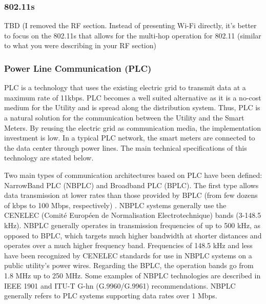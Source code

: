 \documentclass[11pt,draftclsnofoot,onecolumn]{IEEEtran}
\begin{document}
\subsubsection{802.11s}\label{tech::80211s}
TBD
(I removed the RF section. Instead of presenting Wi-Fi directly, it's better to focus on the 802.11s that allows for the multi-hop operation for 802.11 (similar to what you were describing in your RF section)

\subsubsection{Power Line Communication (PLC)}\label{tech::plc}

PLC is a technology that uses the existing electric grid to transmit data at a maximum rate of 11kbps. PLC becomes a well suited alternative as it is a no-cost medium for the Utility and is spread along the distribution system. Thus, PLC is a natural solution for the communication between the Utility and the Smart Meters. By reusing the electric grid as communication media, the implementation investment is low. In a typical PLC network, the smart meters are connected to the data center through power lines. The main technical specifications of this technology are stated below.

Two main types of communication architectures based on PLC have been defined: NarrowBand PLC (NBPLC) and Broadband PLC (BPLC). The first type allows data transmission at lower rates than those provided by BPLC (from few dozens of kbps to 100 Mbps, respectively) \cite{Sabbah2014}. NBPLC systems generally use the CENELEC (Comité Européen de Normalisation Electrotechnique) bands (3-148.5 kHz). NBPLC generally operates in transmission frequencies of up to 500 kHz, as opposed to BPLC, which targets much higher bandwidth at shorter distances and operates over a much higher frequency band. Frequencies of 148.5 kHz and less have been recognized by CENELEC standards for use in NBPLC systems on a public utility's power wires. Regarding the BPLC, the operation bands go from 1.8 MHz up to 250 MHz. Some examples of NBPLC technologies are described in IEEE 1901 and ITU-T G-hn (G.9960/G.9961) recommendations. NBPLC generally refers to PLC systems supporting data rates over 1 Mbps.
\end{document}
